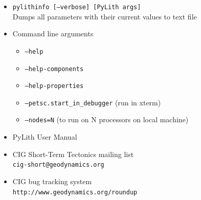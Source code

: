 \documentclass[pdftex,cig,slideColor]{pp4slides}
\begin{document}
  \summary{}

  \begin{itemize}
  \item {\tt pylithinfo [--verbose] [PyLith args]}\\
    Dumps all parameters with their current values to text file
  \item Command line arguments
    \begin{itemize}
    \item {\tt --help}
    \item {\tt --help-components}
    \item {\tt --help-properties}
    \item {\tt --petsc.start\_in\_debugger} (run in xterm)
    \item {\tt --nodes=N} (to run on N processors on local machine)
    \end{itemize}
  \item PyLith User Manual
  \item CIG Short-Term Tectonics mailing list\\
    {\tt cig-short@geodynamics.org}
  \item CIG bug tracking system\\
    {\tt http://www.geodynamics.org/roundup}
  \end{itemize}


\end{document}
